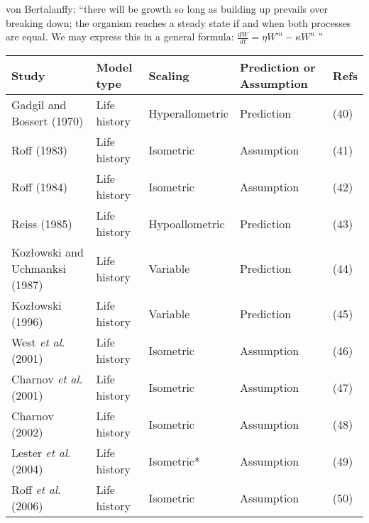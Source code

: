 \documentclass[a4paper]{article} %
\begin{document}
        von Bertalanffy: ``there will be growth so long as building up prevails over breaking down; the organism reaches a steady state if and when both processes are equal. We may express this in a general formula: $\frac{dW}{dt} = \eta W^m - \kappa W^n$ ''
    \begin{table}[]
        \begin{tabular}{|l|l|l|l|l|}
        \hline
        \textbf{Study}                          & \textbf{Model type} & \textbf{Scaling} & \textbf{Prediction or Assumption} & \textbf{Refs} \\ \hline
        Gadgil and Bossert (1970)               & Life history        & Hyperallometric  & Prediction                        & (40)          \\ \hline
        Roff (1983)                             & Life history        & Isometric        & Assumption                        & (41)          \\ \hline
        Roff (1984)                             & Life history        & Isometric        & Assumption                        & (42)          \\ \hline
        Reiss (1985)                            & Life history        & Hypoallometric   & Prediction                        & (43)          \\ \hline
        Kozłowski and Uchmanksi (1987)          & Life history        & Variable         & Prediction                        & (44)          \\ \hline
        Kozłowski (1996)                        & Life history        & Variable         & Prediction                        & (45)          \\ \hline
        West \textit{et al}. (2001)             & Life history        & Isometric        & Assumption                        & (46)          \\ \hline
        Charnov \textit{et al}. (2001)          & Life history        & Isometric        & Assumption                        & (47)          \\ \hline
        Charnov (2002)                          & Life history        & Isometric        & Assumption                        & (48)          \\ \hline
        Lester \textit{et al}. (2004)           & Life history        & Isometric*       & Assumption                        & (49)          \\ \hline
        Roff \textit{et al}. (2006)             & Life history        & Isometric        & Assumption                        & (50)          \\ \hline

\end{tabular}
\end{table}
\end{document}
